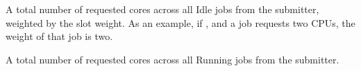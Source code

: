 \begin{description}
\item[\AdAttr{WeightedIdleJobs}:] A total number of requested
cores across all Idle jobs from the submitter, 
weighted by the slot weight.  
As an example, if , 
and a job requests two CPUs, the weight of that job is two.

\item[\AdAttr{WeightedRunningJobs}:] A total number of requested
cores across all Running jobs from the submitter.

\end{description}
